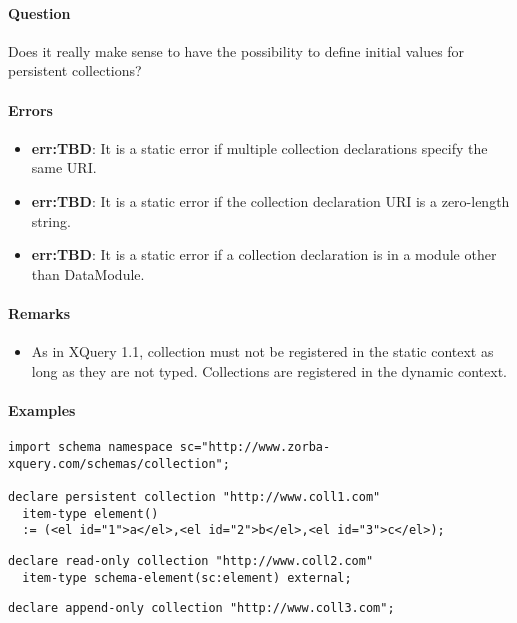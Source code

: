 \documentclass[]{article}
\begin{document}
\paragraph{Question}
Does it really make sense to have the possibility to define initial values for persistent collections?

\vspace{0.5cm}

\paragraph{Errors}
\begin{itemize}
  \item \textbf{err:TBD}: It is a static error if multiple collection declarations specify the same URI.
  \item \textbf{err:TBD}: It is a static error if the collection declaration URI is a zero-length string.
  \item \textbf{err:TBD}: It is a static error if a collection declaration is in a module other than DataModule.
\end{itemize}

\paragraph{Remarks}
\begin{itemize}
  \item As in XQuery 1.1, collection must not be registered in the static context as long as they are not typed. Collections are registered in the dynamic context.
\end{itemize}

\paragraph{Examples}
\begin{verbatim}
import schema namespace sc="http://www.zorba-xquery.com/schemas/collection";

declare persistent collection "http://www.coll1.com" 
  item-type element() 
  := (<el id="1">a</el>,<el id="2">b</el>,<el id="3">c</el>);
\end{verbatim}
\begin{verbatim}
declare read-only collection "http://www.coll2.com" 
  item-type schema-element(sc:element) external;
\end{verbatim}
\begin{verbatim}
declare append-only collection "http://www.coll3.com";
\end{verbatim}
\end{document}
